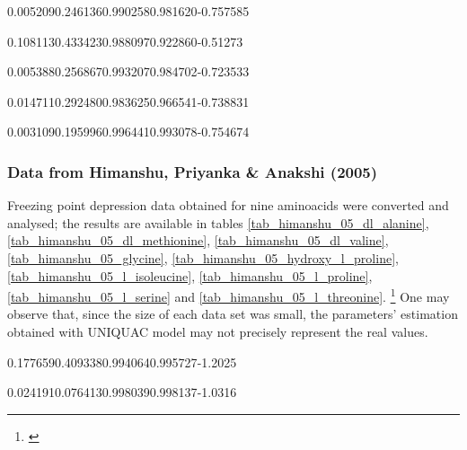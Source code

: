%
	{0.005209}{0.246136}{0.990258}{0.981620}{-0.757585}

%
	{0.108113}{0.433423}{0.988097}{0.922860}{-0.51273}

%
	{0.005388}{0.256867}{0.993207}{0.984702}{-0.723533}

%
	{0.014711}{0.292480}{0.983625}{0.966541}{-0.738831}

%
	{0.003109}{0.195996}{0.996441}{0.993078}{-0.754674}

\FloatBarrier

\subsubsection{Data from Himanshu, Priyanka \& Anakshi (2005)}

Freezing point depression data obtained for nine aminoacids were converted
and analysed; the results are available in tables \ref{tab_himanshu_05_dl_alanine},
\ref{tab_himanshu_05_dl_methionine}, \ref{tab_himanshu_05_dl_valine},
\ref{tab_himanshu_05_glycine}, \ref{tab_himanshu_05_hydroxy_l_proline},
\ref{tab_himanshu_05_l_isoleucine}, \ref{tab_himanshu_05_l_proline},
\ref{tab_himanshu_05_l_serine} and \ref{tab_himanshu_05_l_threonine}.
\footnote{\cite{himanshu2005}} One may observe that, since the size of each data
set was small, the parameters' estimation obtained with UNIQUAC model may not
precisely represent the real values.


%
	{0.177659}{0.409338}{0.994064}{0.995727}{-1.2025}

%
	{0.024191}{0.076413}{0.998039}{0.998137}{-1.0316}


